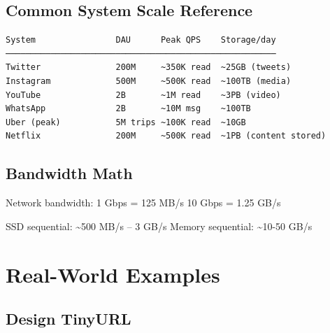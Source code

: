 \documentclass[11pt]{article}
\newenvironment{Shaded}{\begin{snugshade}}{\end{snugshade}}
\newcommand{\DecValTok}[1]{\textcolor[rgb]{0.96,0.45,0.00}{#1}}
\newcommand{\FloatTok}[1]{\textcolor[rgb]{0.96,0.45,0.00}{#1}}
\newcommand{\NormalTok}[1]{\textcolor[rgb]{0.81,0.81,0.76}{#1}}
\newcommand{\OperatorTok}[1]{\textcolor[rgb]{0.81,0.81,0.76}{#1}}
\begin{document}
\subsection{Common System Scale Reference}\label{common-system-scale-reference}

\setcodelang{}

\begin{verbatim}
System                DAU      Peak QPS    Storage/day
──────────────────────────────────────────────────────
Twitter               200M     ~350K read  ~25GB (tweets)
Instagram             500M     ~500K read  ~100TB (media)
YouTube               2B       ~1M read    ~3PB (video)
WhatsApp              2B       ~10M msg    ~100TB
Uber (peak)           5M trips ~100K read  ~10GB
Netflix               200M     ~500K read  ~1PB (content stored)
\end{verbatim}

\subsection{Bandwidth Math}\label{bandwidth-math}


\begin{Shaded}
\begin{Highlighting}[]
\NormalTok{Network bandwidth:}
  \DecValTok{1}\NormalTok{ Gbps  }\OperatorTok{=} \DecValTok{125}\NormalTok{ MB}\OperatorTok{/}\NormalTok{s}
  \DecValTok{10}\NormalTok{ Gbps }\OperatorTok{=} \FloatTok{1.25}\NormalTok{ GB}\OperatorTok{/}\NormalTok{s}

\NormalTok{SSD sequential: }\OperatorTok{\textasciitilde{}}\DecValTok{500}\NormalTok{ MB}\OperatorTok{/}\NormalTok{s – }\DecValTok{3}\NormalTok{ GB}\OperatorTok{/}\NormalTok{s}
\NormalTok{Memory sequential: }\OperatorTok{\textasciitilde{}}\DecValTok{10}\OperatorTok{{-}}\DecValTok{50}\NormalTok{ GB}\OperatorTok{/}\NormalTok{s}
\end{Highlighting}
\end{Shaded}

\section{Real-World Examples}\label{real-world-examples}

\subsection{Design TinyURL}\label{design-tinyurl}
\end{document}
